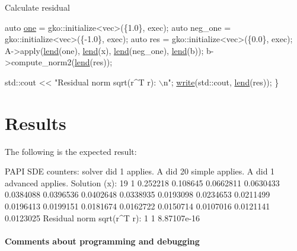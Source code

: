 Calculate residual


\begin{DoxyCode}
    \textcolor{keyword}{auto} \hyperlink{namespacegko_a0059e27f8f4bc348ff65c1e60caf47c8}{one} = gko::initialize<vec>(\{1.0\}, exec);
    \textcolor{keyword}{auto} neg\_one = gko::initialize<vec>(\{-1.0\}, exec);
    \textcolor{keyword}{auto} res = gko::initialize<vec>(\{0.0\}, exec);
    A->apply(\hyperlink{namespacegko_aa8cb4876b72e5e1036ea9575443c439b}{lend}(one), \hyperlink{namespacegko_aa8cb4876b72e5e1036ea9575443c439b}{lend}(x), \hyperlink{namespacegko_aa8cb4876b72e5e1036ea9575443c439b}{lend}(neg\_one), \hyperlink{namespacegko_aa8cb4876b72e5e1036ea9575443c439b}{lend}(b));
    b->compute\_norm2(\hyperlink{namespacegko_aa8cb4876b72e5e1036ea9575443c439b}{lend}(res));

    std::cout << \textcolor{stringliteral}{"Residual norm sqrt(r^T r): \(\backslash\)n"};
    \hyperlink{namespacegko_a859dc47a462721d83728d91ab7fa2148}{write}(std::cout, \hyperlink{namespacegko_aa8cb4876b72e5e1036ea9575443c439b}{lend}(res));
\}
\end{DoxyCode}
 \label{_Results}%
\section*{Results}

The following is the expected result\+:


\begin{DoxyCode}
PAPI SDE counters:
solver did 1 applies.
A did 20 simple applies.
A did 1 advanced applies.
Solution (x):
19 1
0.252218
0.108645
0.0662811
0.0630433
0.0384088
0.0396536
0.0402648
0.0338935
0.0193098
0.0234653
0.0211499
0.0196413
0.0199151
0.0181674
0.0162722
0.0150714
0.0107016
0.0121141
0.0123025
Residual norm sqrt(r^T r):
1 1
8.87107e-16
\end{DoxyCode}


\label{_Commentsaboutprogramminganddebugging}%
\paragraph*{Comments about programming and debugging }


